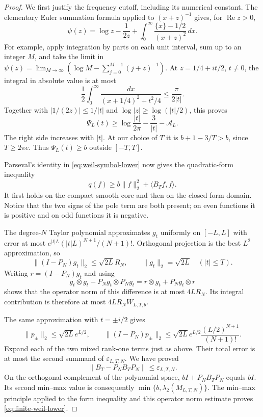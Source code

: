 \begin{proof}
We first justify the frequency cutoff, including its numerical
constant.  The elementary Euler summation formula applied to
$(x+z)^{-1}$ gives, for $\operatorname{Re}z>0$,
\[
 \psi(z)=\log z-\frac1{2z}
        +\int_0^\infty\frac{\{x\}-1/2}{(x+z)^2}\,dx.
\]
For example, apply integration by parts on each unit interval, sum up
to an integer $M$, and take the limit in
$\psi(z)=\lim_{M\to\infty}(\log M-\sum_{j=0}^{M-1}(j+z)^{-1})$.
At $z=1/4+it/2$, $t\ne0$, the integral in absolute value is at most
\[
 \frac12\int_0^\infty
     \frac{dx}{(x+1/4)^2+t^2/4}
       \le\frac{\pi}{2|t|}.
\]
Together with $|1/(2z)|\le1/|t|$ and
$\log|z|\ge\log(|t|/2)$, this proves
\[
 \Psi_L(t)\ge\log\frac{|t|}{2\pi}
                     -\frac3{|t|}-\mathcal A_L.
\]
The right side increases with $|t|$.  At our choice of $T$ it is
$b+1-3/T>b$, since $T\ge2\pi e$.  Thus
$\Psi_L(t)\ge b$ outside $[-T,T]$.

Parseval's identity in \eqref{eq:weil-symbol-lower} now gives the
quadratic-form inequality
\[
 q(f)\ge b\|f\|_2^2+\langle B_Tf,f\rangle.
\]
It first holds on the compact smooth core and then on the closed form
domain.  Notice that the two signs of the pole term are both present;
on even functions it is positive and on odd functions it is negative.

The degree-$N$ Taylor polynomial approximates $g_t$ uniformly on
$[-L,L]$ with error at most
$e^{|t|L}(|t|L)^{N+1}/(N+1)!$.  Orthogonal projection is the best
$L^2$ approximation, so
\[
 \|(I-P_N)g_t\|_2\le\sqrt{2L}R_N,\qquad
 \|g_t\|_2=\sqrt{2L}\quad (|t|\le T).
\]
Writing $r=(I-P_N)g_t$ and using
\[
 g_t\otimes g_t-P_Ng_t\otimes P_Ng_t
      =r\otimes g_t+P_Ng_t\otimes r
\]
shows that the operator norm of this difference is at most $4LR_N$.
Its integral contribution is therefore at most $4LR_NW_{L,T,b}$.

The same approximation with $t=\pm i/2$ gives
\[
 \|p_\pm\|_2\le\sqrt{2L}e^{L/2},\qquad
 \|(I-P_N)p_\pm\|_2
       \le\sqrt{2L}e^{L/2}\frac{(L/2)^{N+1}}{(N+1)!}.
\]
Expand each of the two mixed rank-one terms just as above.  Their
total error is at most the second summand of
$\varepsilon_{L,T,N}$.  We have proved
\[
 \|B_T-P_NB_TP_N\|\le\varepsilon_{L,T,N}.
\]
On the orthogonal complement of the polynomial space,
$bI+P_NB_TP_N$ equals $bI$.  Its second min--max value is consequently
$\min\{b,\lambda_2(M_{L,T,N})\}$.  The min--max principle applied to
the form inequality and this operator norm estimate proves
\eqref{eq:finite-weil-lower}.
\end{proof}

